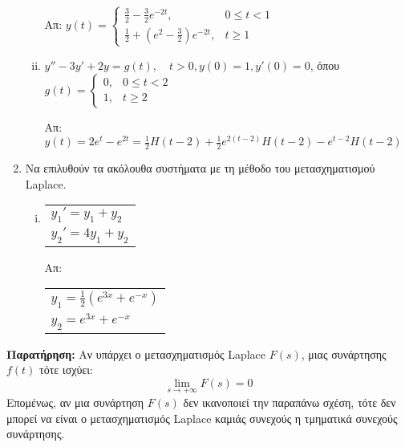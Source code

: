\begin{enumerate}
\begin{enumerate}[i)]
        \hfill Απ: $y(t)=\begin{cases} \frac{3}{2}-\frac{3}{2}e^{-2t},& 0\leq t<1 \\ 
        \frac{1}{2}+(e^2-\frac{3}{2})e^{-2t}, & t\geq 1\end{cases}$

      \item $y''-3y'+2y=g(t),\quad t>0, y(0)=1, y'(0)=0$, όπου $g(t)=\begin{cases} 0, & 
        0\leq t<2 \\ 1, & t\geq 2\end{cases}$

        \hfill Απ: $y(t)=2e^t-e^{2t}=\frac{1}{2}H(t-2)+\frac{1}{2}e^{2(t-2)}
        H(t-2)-e^{t-2}H(t-2)$
    \end{enumerate}

  \item Να επιλυθούν τα ακόλουθα συστήματα με τη μέθοδο του μετασχηματισμού Laplace.

    \begin{enumerate}[i)]
      \item \begin{tabular}{l} $y_1'=y_1+y_2$ \\ $y_2'=4y_1+y_2$\end{tabular} 
        \hfill Απ: \begin{tabular}{l} $y_1=\frac{1}{2}(e^{3x}+e^{-x})$ \\ 
        $y_2=e^{3x}+e^{-x}$\end{tabular}
    \end{enumerate}

\end{enumerate}

\vspace{\baselineskip}

\textbf{Παρατήρηση:} Αν υπάρχει ο μετασχηματισμός Laplace $F(s)$, μιας 
συνάρτησης $f(t)$ τότε ισχύει:
\[
  \lim\limits_{s\to+\infty}F(s)=0
\]
Επομένως, αν μια συνάρτηση $F(s)$ δεν ικανοποιεί την παραπάνω σχέση, τότε δεν μπορεί 
να είναι ο μετασχηματισμός Laplace καμιάς συνεχούς η τμηματικά συνεχούς συνάρτησης.



